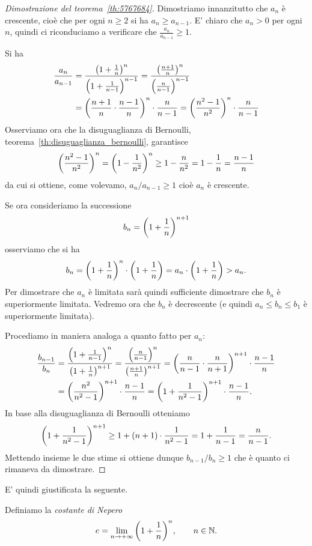 \begin{proof}[Dimostrazione del teorema~\ref{th:5767684}]
Dimostriamo innanzitutto che $a_n$ è crescente, cioè che
per ogni $n\ge 2$ si ha $a_n \ge a_{n-1}$.
E' chiaro che $a_n>0$ per ogni $n$,
quindi ci riconduciamo a
verificare che $\frac{a_n}{a_{n-1}} \ge 1$.

Si ha
\begin{align*}
\frac{a_n}{a_{n-1}}
&= \frac{{\left( 1+\frac 1 n \right)}^n}{{\left( 1+\frac 1 {n-1} \right)}^{n-1}}
= \frac{{\left( \frac{n+1}{n} \right)}^n}{{\left( \frac{n}{n-1} \right)}^{n-1}}\\
&= {\left( \frac{n+1}{n}\cdot\frac{n-1}{n} \right)}^n \cdot \frac{n}{n-1}
= {\left( \frac{n^2- 1}{n^2} \right)}^n \cdot \frac{n}{n-1}
\end{align*}
Osserviamo ora che la disuguaglianza di Bernoulli, 
teorema~\ref{th:disuguaglianza_bernoulli},
garantisce
\[
  {\left( \frac{n^2 -1}{n^2} \right)}^n
  = {\left( 1-\frac{1}{n^2} \right)}^n
  \ge 1 - \frac{n}{n^2} = 1 - \frac{1}{n} = \frac{n-1}{n}
\]
da cui si ottiene, come volevamo, $a_n / a_{n-1} \ge 1$ cioè
$a_n$ è crescente.

Se ora consideriamo la successione
\[
  b_n = {\left( 1+\frac 1 n \right)}^{n+1}
\]
osserviamo che si ha
\[
  b_n = {\left( 1+\frac 1 n \right)}^n \cdot {\left( 1+\frac 1 n \right)}
   = a_n\cdot {\left( 1+\frac 1 n \right)} > a_n.
\]
Per dimostrare che $a_n$ è limitata sarà quindi sufficiente dimostrare
che $b_n$ è superiormente limitata. Vedremo ora che $b_n$ è decrescente (e quindi $a_n \le b_n \le b_1$ è superiormente limitata).

Procediamo in maniera analoga a quanto fatto per $a_n$:
\begin{align*}
\frac{b_{n-1}}{b_n}
& = \frac{{\left( 1+\frac{1}{n-1} \right)}^n}{{\left( 1+\frac{1}{n} \right)}^{n+1}}
  = \frac{{\left( \frac{n}{n-1} \right)}^n}{{\left( \frac{n+1}{n} \right)}^{n+1}}
  = {\left( \frac{n}{n-1}\cdot\frac{n}{n+1} \right)}^{n+1}\cdot\frac{n-1}{n} \\
& = {\left( \frac{n^2}{n^2-1} \right)}^{n+1} \cdot \frac{n-1}{n}
  = {\left( 1 + \frac{1}{n^2-1} \right)}^{n+1} \cdot \frac{n-1}{n}.
\end{align*}
In base alla disuguaglianza di Bernoulli otteniamo
\[
  {\left( 1 + \frac{1}{n^2-1} \right)}^{n+1}
  \ge 1 + (n+1) \cdot \frac{1}{n^2-1}
  = 1 + \frac{1}{n-1} = \frac{n}{n-1}.
\]
Mettendo insieme le due stime si ottiene dunque $b_{n-1}/b_n \ge 1$
che è quanto ci rimaneva da dimostrare.
\end{proof}

E' quindi giustificata la seguente.

\begin{definition}
\mymark{***}
Definiamo la \emph{costante di Nepero}%
%
%
%
%
\[
  e = \lim_{n\to +\infty} {\left( 1+\frac 1 n \right)}^n,
  \qquad n\in{\mathbb N}.
\]
\end{definition}

